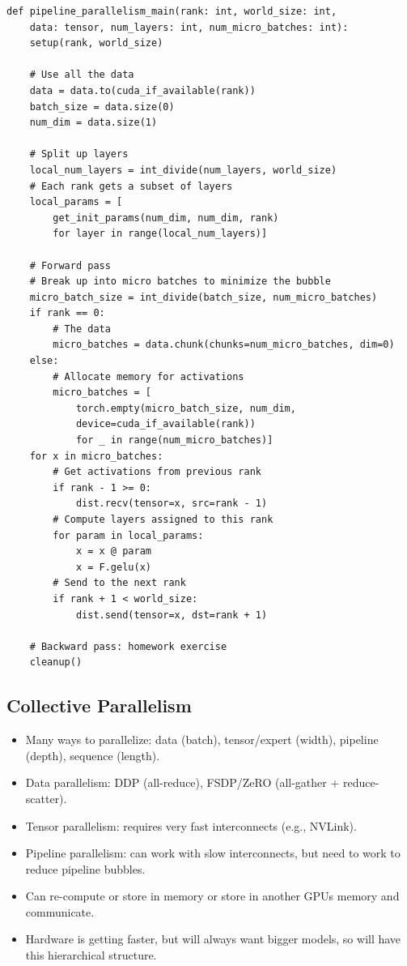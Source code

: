\documentclass[12pt,twoside]{article}
\begin{document}
\begin{verbatim}
def pipeline_parallelism_main(rank: int, world_size: int, 
    data: tensor, num_layers: int, num_micro_batches: int):
    setup(rank, world_size)  
    
    # Use all the data
    data = data.to(cuda_if_available(rank))
    batch_size = data.size(0)  
    num_dim = data.size(1)  
    
    # Split up layers
    local_num_layers = int_divide(num_layers, world_size)  
    # Each rank gets a subset of layers
    local_params = [
        get_init_params(num_dim, num_dim, rank) 
        for layer in range(local_num_layers)]  
    
    # Forward pass
    # Break up into micro batches to minimize the bubble
    micro_batch_size = int_divide(batch_size, num_micro_batches)  
    if rank == 0:
        # The data
        micro_batches = data.chunk(chunks=num_micro_batches, dim=0)
    else:
        # Allocate memory for activations
        micro_batches = [
            torch.empty(micro_batch_size, num_dim,
            device=cuda_if_available(rank)) 
            for _ in range(num_micro_batches)]
    for x in micro_batches:
        # Get activations from previous rank
        if rank - 1 >= 0:
            dist.recv(tensor=x, src=rank - 1)
        # Compute layers assigned to this rank
        for param in local_params:
            x = x @ param
            x = F.gelu(x)
        # Send to the next rank
        if rank + 1 < world_size:  
            dist.send(tensor=x, dst=rank + 1)

    # Backward pass: homework exercise
    cleanup()  
\end{verbatim}

\subsection*{Collective Parallelism}

\begin{itemize}
    \item Many ways to parallelize: data (batch), tensor/expert (width), pipeline (depth), sequence (length).
    \item Data parallelism: DDP (all-reduce), FSDP/ZeRO (all-gather + reduce-scatter).
    \item Tensor parallelism: requires very fast interconnects (e.g., NVLink).
    \item Pipeline parallelism: can work with slow interconnects, but need to work to reduce pipeline bubbles.
    \item Can re-compute or store in memory or store in another GPUs memory and communicate.
    \item Hardware is getting faster, but will always want bigger models, so will have this hierarchical structure.
\end{itemize}
\end{document}
